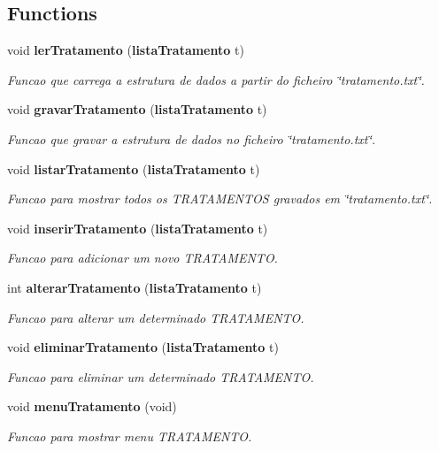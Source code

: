 \subsection*{Functions}
\begin{DoxyCompactItemize}
\item 
void {\bf ler\+Tratamento} ({\bf lista\+Tratamento} t)
\begin{DoxyCompactList}\small\item\em Funcao que carrega a estrutura de dados a partir do ficheiro \char`\"{}tratamento.\+txt\char`\"{}. \end{DoxyCompactList}\item 
void {\bf gravar\+Tratamento} ({\bf lista\+Tratamento} t)
\begin{DoxyCompactList}\small\item\em Funcao que gravar a estrutura de dados no ficheiro \char`\"{}tratamento.\+txt\char`\"{}. \end{DoxyCompactList}\item 
void {\bf listar\+Tratamento} ({\bf lista\+Tratamento} t)
\begin{DoxyCompactList}\small\item\em Funcao para mostrar todos os T\+R\+A\+T\+A\+M\+E\+N\+T\+O\+S gravados em \char`\"{}tratamento.\+txt\char`\"{}. \end{DoxyCompactList}\item 
void {\bf inserir\+Tratamento} ({\bf lista\+Tratamento} t)
\begin{DoxyCompactList}\small\item\em Funcao para adicionar um novo T\+R\+A\+T\+A\+M\+E\+N\+T\+O. \end{DoxyCompactList}\item 
int {\bf alterar\+Tratamento} ({\bf lista\+Tratamento} t)
\begin{DoxyCompactList}\small\item\em Funcao para alterar um determinado T\+R\+A\+T\+A\+M\+E\+N\+T\+O. \end{DoxyCompactList}\item 
void {\bf eliminar\+Tratamento} ({\bf lista\+Tratamento} t)
\begin{DoxyCompactList}\small\item\em Funcao para eliminar um determinado T\+R\+A\+T\+A\+M\+E\+N\+T\+O. \end{DoxyCompactList}\item 
void {\bf menu\+Tratamento} (void)
\begin{DoxyCompactList}\small\item\em Funcao para mostrar menu T\+R\+A\+T\+A\+M\+E\+N\+T\+O. \end{DoxyCompactList}\end{DoxyCompactItemize}


